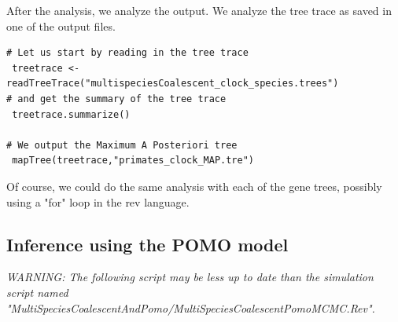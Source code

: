 \documentclass[11pt]{article}
\begin{document}
{\begin{framed}
{\begin{snugshade*}
\begin{lstlisting}
\end{lstlisting}
\end{snugshade*}}


After the analysis, we analyze the output. We analyze the tree trace as saved in one of the output files.
{\tt \begin{snugshade*}
\begin{lstlisting}
# Let us start by reading in the tree trace
 treetrace <- readTreeTrace("multispeciesCoalescent_clock_species.trees")
# and get the summary of the tree trace
 treetrace.summarize()

# We output the Maximum A Posteriori tree
 mapTree(treetrace,"primates_clock_MAP.tre")

\end{lstlisting}
\end{snugshade*}}

Of course, we could do the same analysis with each of the gene trees, possibly using a "for" loop in the rev language.

\end{framed}}

\subsection{Inference using the POMO model }

{\begin{framed}
\begin{center}
\emph{WARNING: The following script may be less up to date than the simulation script named "MultiSpeciesCoalescentAndPomo/MultiSpeciesCoalescentPomoMCMC.Rev".}
\end{center}
\end{framed}}
\vspace{5mm}
\end{document}
